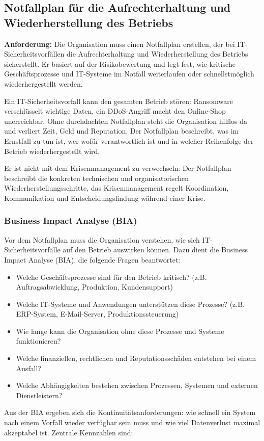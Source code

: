 \newpage
\subsection{Notfallplan für die Aufrechterhaltung und Wiederherstellung des Betriebs}

\textbf{Anforderung:} Die Organisation muss einen Notfallplan erstellen, der bei IT-Sicherheitsvorfällen die Aufrechterhaltung und Wiederherstellung des Betriebs sicherstellt. Er basiert auf der Risikobewertung und legt fest, wie kritische Geschäftsprozesse und IT-Systeme im Notfall weiterlaufen oder schnellstmöglich wiederhergestellt werden.

Ein IT-Sicherheitsvorfall kann den gesamten Betrieb stören: Ransomware verschlüsselt wichtige Daten, ein DDoS-Angriff macht den Online-Shop unerreichbar. Ohne durchdachten Notfallplan steht die Organisation hilflos da und verliert Zeit, Geld und Reputation. Der Notfallplan beschreibt, was im Ernstfall zu tun ist, wer wofür verantwortlich ist und in welcher Reihenfolge der Betrieb wiederhergestellt wird.

Er ist nicht mit dem Krisenmanagement zu verwechseln: Der Notfallplan beschreibt die konkreten technischen und organisatorischen Wiederherstellungsschritte, das Krisenmanagement regelt Koordination, Kommunikation und Entscheidungsfindung während einer Krise.

\subsubsection{Business Impact Analyse (BIA)}
Vor dem Notfallplan muss die Organisation verstehen, wie sich IT-Sicherheitsvorfälle auf den Betrieb auswirken können. Dazu dient die Business Impact Analyse (BIA), die folgende Fragen beantwortet:

\begin{itemize}
    \item Welche Geschäftsprozesse sind für den Betrieb kritisch? (z.B. Auftragsabwicklung, Produktion, Kundensupport)
    \item Welche IT-Systeme und Anwendungen unterstützen diese Prozesse? (z.B. ERP-System, E-Mail-Server, Produktionssteuerung)
    \item Wie lange kann die Organisation ohne diese Prozesse und Systeme funktionieren?
    \item Welche finanziellen, rechtlichen und Reputationsschäden entstehen bei einem Ausfall?
    \item Welche Abhängigkeiten bestehen zwischen Prozessen, Systemen und externen Dienstleistern?
\end{itemize}
\newpage
Aus der BIA ergeben sich die Kontinuitätsanforderungen: wie schnell ein System nach einem Vorfall wieder verfügbar sein muss und wie viel Datenverlust maximal akzeptabel ist. Zentrale Kennzahlen sind:

